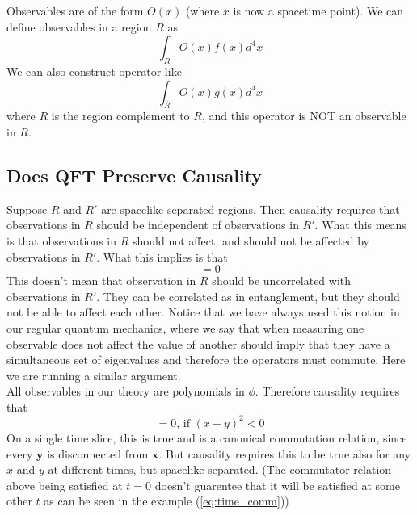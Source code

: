\documentclass[11pt]{article}
\numberwithin{equation}{section}
\begin{document}
    Observables are of the form \(O(x)\) (where \(x\) is now a spacetime point). We can define observables in a region \(R\) as 
    \begin{equation}
        \int_R O(x) f(x) d^4x
    \end{equation}
    We can also construct operator like 
    \begin{equation}
        \int_{\bar{R}} O(x) g(x) d^4x
    \end{equation}
    where \(\bar{R}\) is the region complement to \(R\), and this operator is NOT an observable in \(R\).\\

    \subsection{Does QFT Preserve Causality}

    Suppose \(R\) and \(R'\) are spacelike separated regions. Then causality requires that observations in \(R\) should be independent of observations in \(R'\). What this means is that observations in \(R\) should not affect, and should not be affected by observations in \(R'\). What this implies is that 
    \begin{equation}
        [O(R) , \tilde O(R')] = 0
    \end{equation}
    This doesn't mean that observation in \(R\) should be uncorrelated with observations in \(R'\). They can be correlated as in entanglement, but they should not be able to affect each other. Notice that we have always used this notion in our regular quantum mechanics, where we say that when measuring one observable does not affect the value of another should imply that they have a simultaneous set of eigenvalues and therefore the operators must commute. Here we are running a similar argument. \\

    All observables in our theory are polynomials in \(\phi\). Therefore causality requires that 
    \begin{equation}
        [\phi(x), \phi(y)] = 0\text{, if }(x-y)^2 <0
    \end{equation}
    On a single time slice, this is true and is a canonical commutation relation, since every \(\textbf{y}\) is disconnected from \(\textbf{x}\). But causality requires this to be true also for any \(x\) and \(y\) at different times, but spacelike separated. (The commutator relation above being satisfied at \(t=0\) doesn't guarentee that it will be satisfied at some other \(t\) as can be seen in the example (\ref{eq:time_comm}))\\
\end{document}
